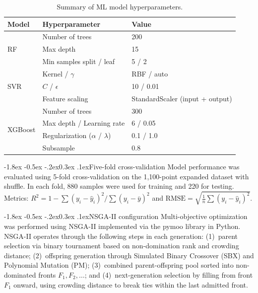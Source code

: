 \documentclass[12pt, a4paper]{report}
\makeatletter
\renewcommand{\section}{\@startsection{section}{1}{\z@}%
  {-1.8ex \@plus -0.5ex \@minus -.2ex}{0.3ex \@plus.1ex}{\normalfont\bfseries}}
\makeatother
\begin{document}
\begin{table}[!htbp]
\centering \small
\caption{Summary of ML model hyperparameters.}
\label{tab:hyperparams}
\begin{tabular}{|l|l|l|}
\hline
\textbf{Model} & \textbf{Hyperparameter} & \textbf{Value} \\ \hline
\multirow{3}{*}{RF} & Number of trees & 200 \\ \cline{2-3}
 & Max depth & 15 \\ \cline{2-3}
 & Min samples split / leaf & 5 / 2 \\ \hline
\multirow{3}{*}{SVR} & Kernel / $\gamma$ & RBF / auto \\ \cline{2-3}
 & $C$ / $\epsilon$ & 10 / 0.01 \\ \cline{2-3}
 & Feature scaling & StandardScaler (input + output) \\ \hline
\multirow{4}{*}{XGBoost} & Number of trees & 300 \\ \cline{2-3}
 & Max depth / Learning rate & 6 / 0.05 \\ \cline{2-3}
 & Regularization ($\alpha$ / $\lambda$) & 0.1 / 1.0 \\ \cline{2-3}
 & Subsample & 0.8 \\ \hline
\end{tabular}
\end{table}

\section{Five-fold cross-validation}
Model performance was evaluated using 5-fold cross-validation on the 1,100-point expanded dataset with shuffle. In each fold, 880 samples were used for training and 220 for testing. Metrics: $R^2 = 1 - \sum(y_i - \hat{y}_i)^2 / \sum(y_i - \bar{y})^2$ and $\text{RMSE} = \sqrt{\frac{1}{n}\sum(y_i - \hat{y}_i)^2}$.

\section{NSGA-II configuration}
Multi-objective optimization was performed using NSGA-II implemented via the pymoo library in Python. NSGA-II operates through the following steps in each generation: (1)~parent selection via binary tournament based on non-domination rank and crowding distance; (2)~offspring generation through Simulated Binary Crossover (SBX) and Polynomial Mutation (PM); (3)~combined parent-offspring pool sorted into non-dominated fronts $F_1, F_2, \ldots$; and (4)~next-generation selection by filling from front $F_1$ onward, using crowding distance to break ties within the last admitted front.
\end{document}
